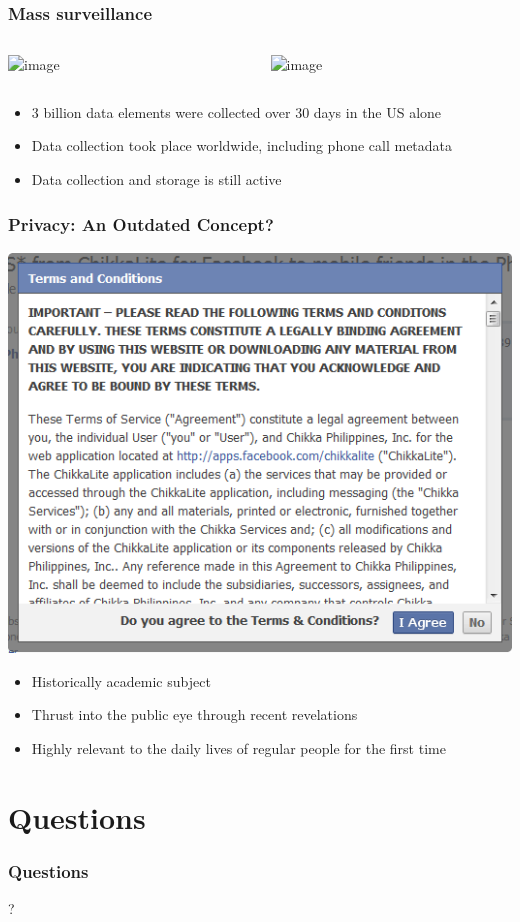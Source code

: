 \documentclass[12pt]{beamer}
\begin{document}
\begin{frame}
\frametitle{Mass surveillance}
\begin{columns}
\begin{column}{0.5\textwidth}
\begin{center}
\includegraphics<2->[scale=0.1]{snowden.jpg}
\end{center}
\end{column}
\begin{column}{0.5\textwidth}
\begin{center}
\includegraphics<2->[scale=0.2]{BoundlessInformant.PNG}
\end{center}
\end{column}
\end{columns}
\begin{itemize}
\item<3-> 3 billion data elements were collected over 30 days in the US alone
\item<4-> Data collection took place worldwide, including phone call metadata
\item<5-> Data collection and storage is still active
\end{itemize}
\end{frame}

\begin{frame}
\frametitle{Privacy: An Outdated Concept?}
\begin{center}
\includegraphics[scale=0.3]{termsandconditions.png}
\end{center}
\begin{itemize}
\item<2-> Historically academic subject
\item<3-> Thrust into the public eye through recent revelations
\item<4-> Highly relevant to the daily lives of regular people for the first time
\end{itemize}
\end{frame}

\section{Questions}

\begin{frame}
\frametitle{Questions}
\begin{center}
\Huge{?}
\end{center}
\end{frame}

 
\end{document}
